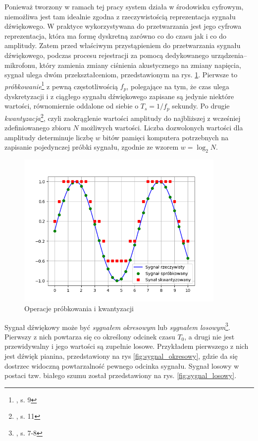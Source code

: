 Ponieważ tworzony w ramach tej pracy system działa w środowisku cyfrowym, niemożliwa jest tam idealnie zgodna z rzeczywistością reprezentacja sygnału dźwiękowego. W praktyce wykorzystywana do przetwarzania jest jego cyfrowa reprezentacja, która ma formę dyskretną zarówno co do czasu jak i co do amplitudy. Zatem przed właściwym przystąpieniem do przetwarzania sygnału dźwiękowego, podczas procesu rejestracji za pomocą dedykowanego urządzenia--mikrofonu, który zamienia zmiany ciśnienia akustycznego na zmiany napięcia, sygnał ulega dwóm przekształceniom, przedstawionym na rys.  \ref{fig:probkowanie_i_kwantyzacja}. Pierwsze to \emph{próbkowanie}\footnote{\cite{lerch_introduction_2012}, s. 9} z pewną częstotliwością $f_p$, polegające na tym, że czas ulega dyskretyzacji i z ciągłego sygnału dźwiękowego zapisane są jedynie niektóre wartości, równomiernie oddalone od siebie o $T_s=1/f_p$ sekundy. Po drugie \emph{kwantyzacja}\footnote{\cite{lerch_introduction_2012}, s. 11}, czyli zaokrąglenie wartości amplitudy do najbliższej z wcześniej zdefiniowanego zbioru $N$ możliwych wartości. Liczba dozwolonych wartości dla amplitudy determinuje liczbę $w$ bitów pamięci komputera potrzebnych na zapisanie pojedynczej próbki sygnału, zgodnie ze wzorem $w=\log_{2}N$.

\begin{figure}[htb]
    \centering
    \includegraphics[width=0.9\textwidth]{images/probkowanie_i_kwantyzacja}
    \caption{Operacje próbkowania i kwantyzacji}
    \label{fig:probkowanie_i_kwantyzacja}
\end{figure}

Sygnał dźwiękowy może być \emph{sygnałem okresowym} lub \emph{sygnałem losowym}\footnote{\cite{lerch_introduction_2012}, s. 7-8}. Pierwszy z nich powtarza się co określony odcinek czasu $T_0$, a drugi nie jest przewidywalny i jego wartości są zupełnie losowe. Przykładem pierwszego z nich jest dźwięk pianina, przedstawiony na rys \ref{fig:sygnal_okresowy}, gdzie da się dostrzec widoczną powtarzalność pewnego odcinka sygnału.  Sygnał losowy w postaci tzw. białego szumu został przedstawiony na rys. \ref{fig:sygnal_losowy}.

